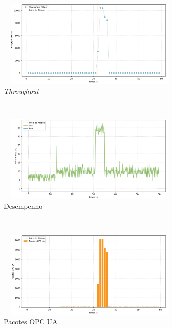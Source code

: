 \begin{apendicesenv}
\begin{figure}[htbp!]
    \centering
    \caption{\label{fig:2-dos_function_call_null_deref}Gráficos do ataque de DoS por desreferenciação de ponteiro nulo - nível de segurança: `Sign \& Encrypt'.}
    \begin{subfigure}[t]{0.5\textwidth}
        \centering
        \caption{\textit{Throughput}}
        \includegraphics[width=1\textwidth, height=120pt]{USPSC-img/output/cropped/2-dos_function_call_null_deref-tput.png}
    \end{subfigure}%
    ~ 
    \begin{subfigure}[t]{0.5\textwidth}
        \centering
        \caption{Desempenho}
        \includegraphics[width=1\textwidth, height=120pt]{USPSC-img/output/cropped/2-dos_function_call_null_deref-perf.png}
    \end{subfigure}%
    \\
    \begin{subfigure}[t]{0.5\textwidth}
        \centering
        \caption{Pacotes OPC UA}
        \includegraphics[width=1\textwidth, height=120pt]{USPSC-img/output/cropped/2-dos_function_call_null_deref-pack.png}
    \end{subfigure}%
    ~
    \begin{subfigure}[t]{0.5\textwidth}

\end{subfigure}
\end{figure}
\end{apendicesenv}
